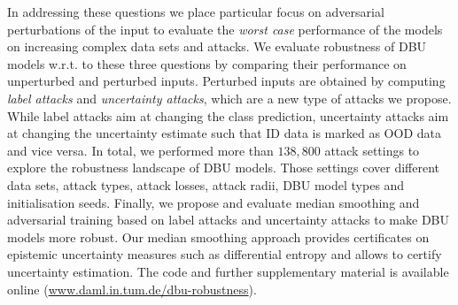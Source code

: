In addressing these questions we place particular focus on adversarial perturbations of the input to evaluate the \emph{worst case} performance of the models on increasing complex data sets and attacks.
%
We evaluate robustness of DBU models w.r.t. to these three questions by comparing their performance on unperturbed and perturbed inputs. Perturbed inputs are obtained by computing \emph{label attacks} and \emph{uncertainty attacks}, which are a new type of attacks we propose.  While label attacks aim at changing the class prediction, uncertainty attacks aim at changing the uncertainty estimate such that ID data is marked as OOD data and vice versa.
%
In total, we performed more than $138,800$ attack settings to explore the robustness landscape of DBU models. Those settings cover different data sets, attack types, attack losses, attack radii, DBU model types and initialisation seeds.
%
Finally, we propose and evaluate median smoothing and adversarial training based on label attacks and uncertainty attacks to make DBU models more robust. Our median smoothing approach provides certificates on epistemic uncertainty measures such as differential entropy and allows to certify uncertainty estimation.  The code and further supplementary material is available online (\url{www.daml.in.tum.de/dbu-robustness}).





